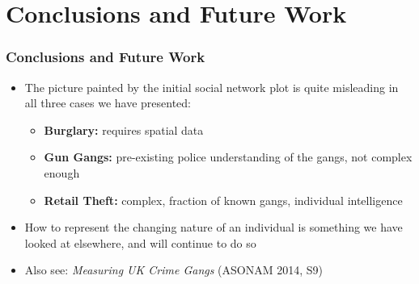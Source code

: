 \documentclass[pdftex]{beamer}
\begin{document}
{ %
    \begin{frame}[plain]
     \end{frame}
}


\section{Conclusions and Future Work}

\begin{frame}
\frametitle{Conclusions and Future Work}
\begin{itemize}
\item The picture painted by the initial social network plot is quite
  misleading in all three cases we have presented:
\begin{itemize}
\item {\textbf{Burglary:}} requires spatial data
\item {\textbf{Gun Gangs:}} pre-existing police understanding of the gangs, not
  complex enough
\item {\textbf{Retail Theft:}} complex, fraction of known gangs, individual intelligence
\end{itemize}
\item How to represent the changing nature of an individual is
  something we have looked at elsewhere, and will continue to do so
\item Also see: {\emph{Measuring UK Crime Gangs}} (ASONAM 2014, S9)
\end{itemize}
\end{frame}
\end{document}
